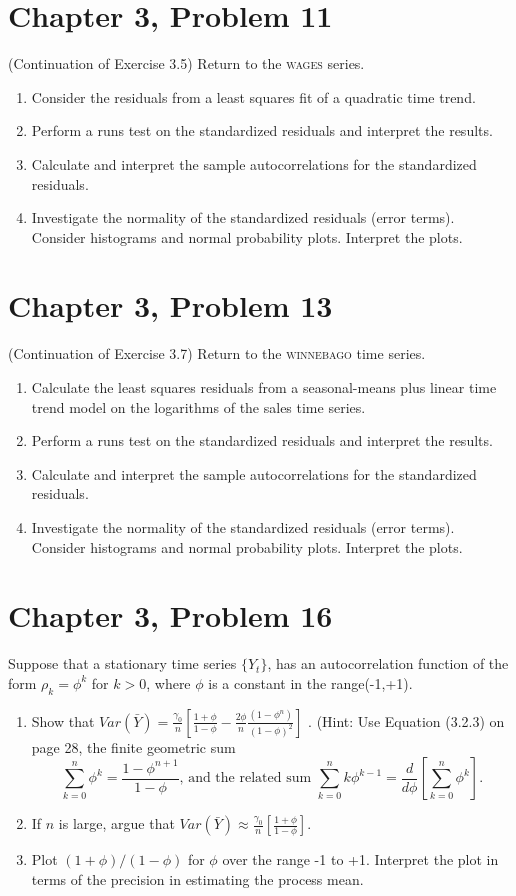 \documentclass[11pt]{article}
\newif\ifclearpage
\newcommand{\problem}[1]{\section*{#1}}
\newcommand{\solution}{\hrulefill}
\newcommand{\maybeclearpage}{\ifclearpage\clearpage\fi}
\begin{document}
\problem{Chapter 3, Problem 11}
(Continuation of  Exercise 3.5) Return to the \textsc{wages} series.
\begin{enumerate}
	\item Consider the residuals from a least squares fit of a quadratic time trend.
	\item Perform a runs test on the standardized residuals and interpret the results.
	\item Calculate and interpret the sample autocorrelations for the standardized residuals.
	\item Investigate the normality of the standardized residuals (error terms). Consider histograms and normal probability plots. Interpret the plots. 
\end{enumerate}

\solution



\maybeclearpage
\problem{Chapter 3, Problem 13}
(Continuation of Exercise 3.7) Return to the \textsc{winnebago} time series.
\begin{enumerate}
	\item Calculate the least squares residuals from a seasonal-means plus linear time trend model on the logarithms of the sales time series.
	\item Perform a runs test on the standardized residuals and interpret the results.
	\item Calculate and interpret the sample autocorrelations for the standardized residuals.
	\item Investigate the normality of the standardized residuals (error terms). Consider histograms and normal probability plots. Interpret the plots. 
\end{enumerate}

\solution



\maybeclearpage
\problem{Chapter 3, Problem 16}
Suppose that a stationary time series $\{Y_t\}$, has an autocorrelation function of the form $\rho_k = \phi^k$ for $k > 0$, where $\phi$ is a constant in the range(-1,+1). 
\begin{enumerate}
	\item Show that $Var(\bar{Y}) = \frac{\gamma_0}{n} \left[ \frac{1+\phi}{1-\phi} - \frac{2\phi}{n}\frac{(1-\phi^n)}{(1-\phi)^2} \right] $ . (Hint: Use Equation (3.2.3) on page 28, the finite geometric sum $$\sum_{k=0}^n \phi^k = \frac{1-\phi^{n+1}}{1-\phi} \text{, and the related sum } \sum_{k=0}^n k\phi^{k-1} = \frac{d}{d\phi} \left[ \sum_{k=0}^n \phi^k \right].$$
	\item If $n$ is large, argue that $Var(\bar{Y}) \approx \frac{\gamma_0}{n} \left[ \frac{1+\phi}{1-\phi} \right]$. 
	\item Plot $(1+\phi)/(1-\phi)$ for $\phi$ over the range -1 to +1. Interpret the plot in terms of the precision in estimating the process mean.
\end{enumerate}
\solution
\end{document}
